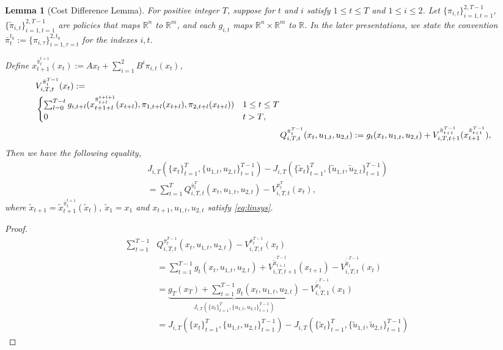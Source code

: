 \documentclass{article}
\newtheorem{lemma}{Lemma}
\begin{document}
\begin{lemma}[Cost Difference Lemma]
For positive integer $T$, suppose for $t$ and $i$ satisfy $1 \leq t \leq T$ and $1 \leq i \leq 2$. Let 
$\{\pi_{i,t}\}_{i=1,t=1}^{2,T-1}$,$\{\tilde{\pi}_{i,t}\}_{i=1,t=1}^{2,T-1}$ are policies that maps $\mathbb{R}^{n}$ to $\mathbb{R}^{m}$, and each $g_{i,t}$ maps $\mathbb{R}^{n} \times \mathbb{R}^{m}$ to $\mathbb{R}$. In the later presentations, we state the convention $\bar{\pi}_{t}^{t_{0}} := \{\pi_{i,\tau}\}_{i=1,\tau=t}^{2,t_{0}}$ for the indexes $i,t$.

Define $x_{t+1}^{\bar{\pi}_{t}^{t+1}}(x_{t}):= Ax_{t} + \sum_{i=1}^{2} B^{i}\pi_{i,t}(x_{t})$,
\begin{align}
\begin{split}
    &V_{i,T,t}^{\bar{\pi}_{t}^{T-1}}(x_{t}) := \\
    &\begin{cases}
        \sum_{l=0}^{T-t} g_{i,t+l}(x_{t+1+l}^{\bar{\pi}_{t+l}^{t+l+1}}(x_{t+l}),\pi_{1,t+l}(x_{t+l}),\pi_{2,t+l}(x_{t+l})) & \text{$1 \leq t \leq T$}\\
        $0$ & \text{$t > T$},
    \end{cases}
\end{split}
    \\
    &Q_{i,T,t}^{\bar{\pi}_{t}^{T-1}}(x_{t},u_{1,t},u_{2,t}) := g_{t}(x_{t},u_{1,t},u_{2,t}) + V_{i,T,t+1}^{\bar{\pi}_{t+1}^{T-1}}(x_{t+1}^{\bar{\pi}_{t+1}^{T-1}})
    ,
\end{align}
Then we have the following equality,
\begin{align}
    J_{i,T}(\{x_{t}\}_{t=1}^{T},\{u_{1,t},u_{2,t}\}_{t=1}^{T-1}) - J_{i,T}(\{\tilde{x}_{t}\}_{t=1}^{T},\{\tilde{u}_{1,t},\tilde{u}_{2,t}\}_{t=1}^{T-1})\\
    = \sum_{t=1}^{T} Q_{i,T,t}^{\bar{\pi}_{t}^{T}}(x_{t},u_{1,t},u_{2,t}) -  V_{i,T,t}^{\bar{\pi}_{t}^{T}}(x_{t}),
\end{align}
where $\tilde{x}_{t+1} = \tilde{x}_{t+1}^{\bar{\pi}_{t}^{t+1}}(\tilde{x}_{t})$, $\tilde{x}_{1} = x_{1}$ and $x_{t+1},u_{1,t},u_{2,t}$ satisfy \eqref{eq:linsys}.
\end{lemma}

\begin{proof}
\begin{align*}
    \sum_{t=1}^{T-1} &Q_{i,T,t}^{\bar{\pi}_{t}^{T-1}}(x_{t},u_{1,t},u_{2,t}) -  V_{i,T,t}^{\bar{\pi}_{t}^{T-1}}(x_{t}) \\
    &= \sum_{t=1}^{T-1} g_{t}(x_{t},u_{1,t},u_{2,t})+ V_{i,T,t+1}^{\bar{\tilde{\pi}}_{t+1}^{T-1}}(x_{t+1})-V_{i,T,t}^{\bar{\tilde{\pi}}_{t}^{T-1}}(x_{t})\\
    &= \underbrace{g_{T}(x_{T}) + \sum_{t=1}^{T-1} g_{t}(x_{t},u_{1,t},u_{2,t})}_{J_{i,T}(\{x_{t}\}_{t=1}^{T},\{u_{1,t},u_{2,t}\}_{t=1}^{T-1})} - V_{i,T,1}^{\bar{\tilde{\pi}}_{1}^{T-1}}(x_{1})\\
    &= J_{i,T}(\{x_{t}\}_{t=1}^{T},\{u_{1,t},u_{2,t}\}_{t=1}^{T-1}) - J_{i,T}(\{\tilde{x}_{t}\}_{t=1}^{T},\{\tilde{u}_{1,t},\tilde{u}_{2,t}\}_{t=1}^{T-1})
\end{align*}
\end{proof}
\end{document}
